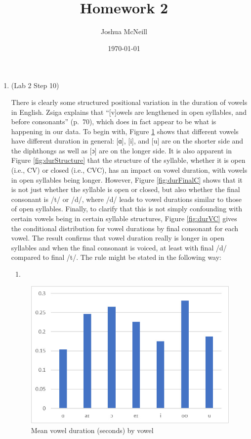 \documentclass{article}
\author{Joshua McNeill}
\title{Homework 2}
\date{\today}
\begin{document}
  \maketitle
  \begin{enumerate}
    \item (Lab 2 Step 10)

    There is clearly some structured positional variation in the duration of vowels in English. Zsiga explains that ``[v]owels are lengthened in open syllables, and before consonants'' (p.~70), which does in fact appear to be what is happening in our data. To begin with, Figure \ref{fig:durVowel} shows that different vowels have different duration in general: [ɑ], [i], and [u] are on the shorter side and the diphthongs as well as [ɔ] are on the longer side. It is also apparent in Figure \ref{fig:durStructure} that the structure of the syllable, whether it is open (i.e., CV) or closed (i.e., CVC), has an impact on vowel duration, with vowels in open syllables being longer. However, Figure \ref{fig:durFinalC} shows that it is not just whether the syllable is open or closed, but also whether the final consonant is /t/ or /d/, where /d/ leads to vowel durations similar to those of open syllables. Finally, to clarify that this is not simply confounding with certain vowels being in certain syllable structures, Figure \ref{fig:durVC} gives the conditional distribution for vowel durations by final consonant for each vowel. The result confirms that vowel duration really is longer in open syllables and when the final consonant is voiced, at least with final /d/ compared to final /t/. The rule might be stated in the following way:
    \begin{enumerate}
      \item {}
    \end{enumerate}
    
    \begin{figure}[htb]
      \caption{Mean vowel duration (seconds) by vowel}
      \label{fig:durVowel}
      \centering
      \includegraphics{durVowel.jpg}
    \end{figure}


\end{enumerate}
\end{document}
